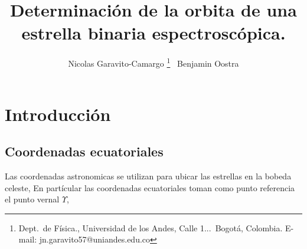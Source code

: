 \documentclass[Proceedings]{ascelike}
\begin{document}
%
\title{Determinaci\'on de la orbita de una estrella binaria espectrosc\'opica.}
%
\author{
Nicolas Garavito-Camargo%
%
\thanks{
Dept.\ de F\'isica.,
Universidad de los Andes, 
Calle 1...\ Bogot\'a, Colombia. E-mail: jn.garavito57@uniandes.edu.co}
\ Benjamin Oostra\footnotemark[1]
%
%
%
%
%
%
}
%
\maketitle
%
\begin{abstract}

\end{abstract}


%
%
%
\section{Introducci\'on}


\subsection{Coordenadas ecuatoriales}

Las coordenadas astronomicas se utilizan para ubicar las estrellas en la bobeda celeste, 
En part\'icular las coordenadas ecuatoriales toman como punto referencia 
el punto vernal $\Upsilon$, 
\end{document}
